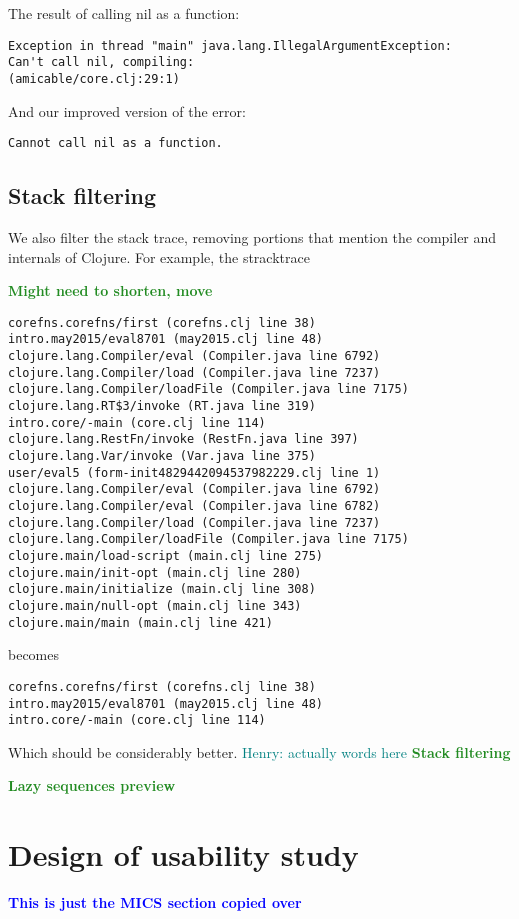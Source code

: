\documentclass[submission,copyright,creativecommons]{eptcs}
\newcommand{\allcomments}[1]{{#1}}
\newcommand{\emcomment}[1]{{\bf \textcolor{ForestGreen}{\allcomments{{#1}}}}}
\newcommand{\hfcomment}[1]{\textcolor{Teal}{\allcomments{Henry: {#1}}}}
\newcommand{\thcomment}[1]{{\bf \textcolor{blue}{\allcomments{{#1}}}}}
\begin{document}
The result of calling nil as a function:
\begin{verbatim}
Exception in thread "main" java.lang.IllegalArgumentException:
Can't call nil, compiling:
(amicable/core.clj:29:1)
\end{verbatim}
And our improved version of the error:
\begin{verbatim}
Cannot call nil as a function.
\end{verbatim}

\subsection{Stack filtering}
We also filter the stack trace, removing portions that mention the compiler and internals of Clojure. For example, the stracktrace 

\emcomment{Might need to shorten, move}

\begin{verbatim}
corefns.corefns/first (corefns.clj line 38)
intro.may2015/eval8701 (may2015.clj line 48)
clojure.lang.Compiler/eval (Compiler.java line 6792)
clojure.lang.Compiler/load (Compiler.java line 7237)
clojure.lang.Compiler/loadFile (Compiler.java line 7175)
clojure.lang.RT$3/invoke (RT.java line 319)
intro.core/-main (core.clj line 114)
clojure.lang.RestFn/invoke (RestFn.java line 397)
clojure.lang.Var/invoke (Var.java line 375)
user/eval5 (form-init4829442094537982229.clj line 1)
clojure.lang.Compiler/eval (Compiler.java line 6792)
clojure.lang.Compiler/eval (Compiler.java line 6782)
clojure.lang.Compiler/load (Compiler.java line 7237)
clojure.lang.Compiler/loadFile (Compiler.java line 7175)
clojure.main/load-script (main.clj line 275)
clojure.main/init-opt (main.clj line 280)
clojure.main/initialize (main.clj line 308)
clojure.main/null-opt (main.clj line 343)
clojure.main/main (main.clj line 421)
\end{verbatim}
 
becomes 

\begin{verbatim}
corefns.corefns/first (corefns.clj line 38)
intro.may2015/eval8701 (may2015.clj line 48)
intro.core/-main (core.clj line 114)
\end{verbatim} 
 
Which should be considerably better.
\hfcomment{actually words here}
\emcomment{Stack filtering}

\emcomment{Lazy sequences preview}

\section{Design of usability study}\label{sec:study}
	\thcomment{This is just the MICS section copied over}
	
\end{document}
